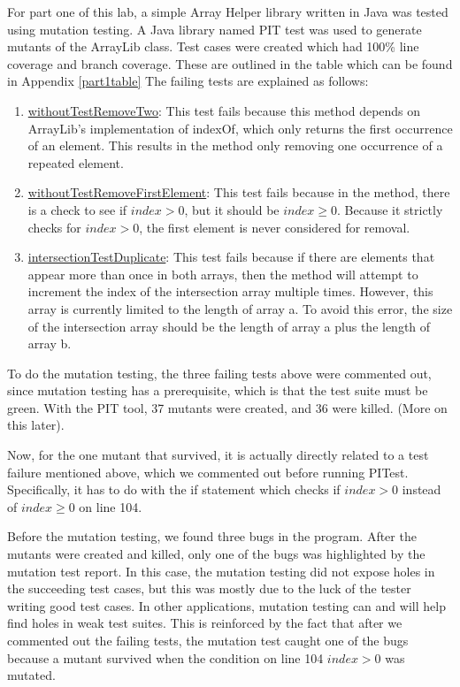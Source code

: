 For part one of this lab, a simple Array Helper library written in Java was
tested using mutation testing. A Java library named PIT test was used to 
generate mutants of the ArrayLib class. Test cases were created which had 100\%
line coverage and branch coverage. These are outlined in the table which can be found in Appendix \ref{part1table}
The failing tests are explained as follows:

\begin{enumerate}
\item \underline{withoutTestRemoveTwo}:
        This test fails because this method depends on ArrayLib's implementation
        of indexOf, which only returns the first occurrence of an element. This
        results in the method only removing one occurrence of a repeated
        element.
\item \underline{withoutTestRemoveFirstElement}:
        This test fails because in the method, there is a check to see if
        $index > 0$, but it should be $index \geq 0$. Because it strictly checks
        for $index > 0$, the first element is never considered for removal.
\item \underline{intersectionTestDuplicate}:
        This test fails because if there are elements that appear more than once
        in both arrays, then the method will attempt to increment the index
        of the intersection array multiple times. However, this array is
        currently limited to the length of array a. To avoid this error, the
        size of the intersection array should be the length of array a plus the
        length of array b. 
\end{enumerate}

To do the mutation testing, the three failing tests above were commented out,
since mutation testing has a prerequisite, which is that the test suite must be
green. With the PIT tool, 37 mutants were created, and 36 were killed. (More on
this later).



Now, for the one mutant that survived, it is actually directly related to a test
failure mentioned above, which we commented out before running PITest.
Specifically, it has to do with the if statement which checks if $index > 0$
instead of $index \geq 0$ on line 104. 


Before the mutation testing, we found three bugs in the program. After the
mutants were created and killed, only one of the bugs was highlighted by the
mutation test report. In this case, the mutation testing did not expose holes in
the succeeding test cases, but this was mostly due to the luck of the tester
writing good test cases. In other applications, mutation testing can and will
help find holes in weak test suites. This is reinforced by the fact that after
we commented out the failing tests, the mutation test caught one of the bugs
because a mutant survived when the condition on line 104 $index > 0$ was mutated.

